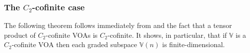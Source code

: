 \documentclass[11pt,b5paper,notitlepage]{article}
\theoremstyle{definition}
\theoremstyle{plain}
\newtheorem{pp}[df]{Proposition}
\newcommand{\wtd}{\widetilde}
\newcommand{\mbf}{\mathbf}
\newcommand{\Vbb}{\mathbb V}
\newcommand{\Wbb}{\mathbb W}
\newcommand{\Cbb}{\mathbb C}
\newcommand{\Nbb}{\mathbb N}
\newcommand{\Zbb}{\mathbb Z}
\newcommand{\<}{\left\langle}
\renewcommand{\>}{\right\rangle}
\numberwithin{equation}{section}
\begin{document}

\subsubsection{The $C_2$-cofinite case}


The following theorem follows immediately from \cite[Lem. 2.4]{Miy-modular-invariance} and the fact that a tensor product of $C_2$-cofinite VOAs is $C_2$-cofinite. It shows, in particular, that if $\Vbb$ is a $C_2$-cofinite VOA then each graded subspace $\Vbb(n)$ is finite-dimensional.
\end{document}
